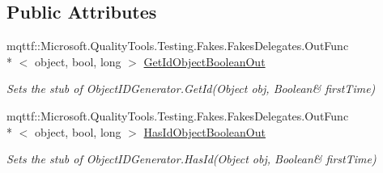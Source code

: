 \subsection*{Public Attributes}
\begin{DoxyCompactItemize}
\item 
mqttf\-::\-Microsoft.\-Quality\-Tools.\-Testing.\-Fakes.\-Fakes\-Delegates.\-Out\-Func\\*
$<$ object, bool, long $>$ \hyperlink{class_system_1_1_runtime_1_1_serialization_1_1_fakes_1_1_stub_object_i_d_generator_ab530aa347059b08527fb9ac69507512a}{Get\-Id\-Object\-Boolean\-Out}
\begin{DoxyCompactList}\small\item\em Sets the stub of Object\-I\-D\-Generator.\-Get\-Id(Object obj, Boolean\& first\-Time)\end{DoxyCompactList}\item 
mqttf\-::\-Microsoft.\-Quality\-Tools.\-Testing.\-Fakes.\-Fakes\-Delegates.\-Out\-Func\\*
$<$ object, bool, long $>$ \hyperlink{class_system_1_1_runtime_1_1_serialization_1_1_fakes_1_1_stub_object_i_d_generator_ab19f594ab5660e56975441eff3e34bd9}{Has\-Id\-Object\-Boolean\-Out}
\begin{DoxyCompactList}\small\item\em Sets the stub of Object\-I\-D\-Generator.\-Has\-Id(Object obj, Boolean\& first\-Time)\end{DoxyCompactList}\end{DoxyCompactItemize}
